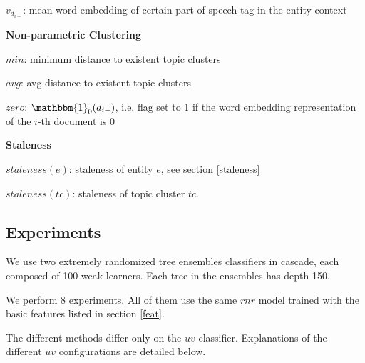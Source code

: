 \documentclass{article}
\begin{document}
\begin{itemize*}
    \begin{itemize*}
        \item $v_{d_{i-}}$: mean word embedding of certain part of speech tag in the entity context
    \end{itemize*}
  \item \textbf{Non-parametric Clustering}
    \begin{itemize*}
        \item $min$: minimum distance to existent topic clusters
        \item $avg$: avg distance to existent topic clusters
        \item $zero$: $\mathbbm{1}_{0}{(d_{i-})}$, i.e. flag set to 1 if the word embedding representation of the $i$-th document is $0$
    \end{itemize*}
  \item \textbf{Staleness}
    \begin{itemize*}
        \item $staleness(e)$: staleness of entity $e$, see section \ref{staleness}
        \item $staleness(tc)$: staleness of topic cluster $tc$.
    \end{itemize*}
\end{itemize*}


\subsection{Experiments}

We use two extremely randomized tree ensembles classifiers \cite{GEW06a} in cascade, each composed of 100 weak learners. Each tree in the ensembles has depth 150.

We perform 8 experiments. All of them use the same $rnr$ model trained with the basic features listed in section \ref{feat}.

The different methods differ only on the $uv$ classifier. Explanations of the different $uv$ configurations are detailed below.
\end{document}
